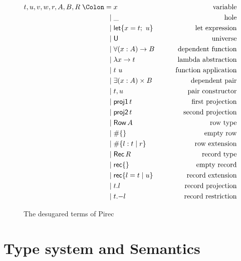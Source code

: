\begin{figure}
  \begin{alignat*}{2}
    t, u, v, w, r, A, B, R \Coleqq{}
     & x
     & \qquad\text{variable}
    \\
    \mid{}
     & \_
     & \qquad\text{hole}
    \\
    \mid{}
     & {\Let \{ x = t;\ u \}}
     & \qquad\text{let expression}
    \\
    \mid{}
     & {\Univ}
     & \qquad\text{universe}
    \\
    \mid{}
     & \forall (x : A) \to B
     & \qquad\text{dependent function}
    \\
    \mid{}
     & \lambda x \to t
     & \qquad\text{lambda abstraction}
    \\
    \mid{}
     & t\ u
     & \qquad\text{function application}
    \\
    \mid{}
     & \exists (x : A) \times B
     & \qquad\text{dependent pair}
    \\
    \mid{}
     & t, u
     & \qquad\text{pair constructor}
    \\
    \mid{}
     & {\ProjOne t}
     & \qquad\text{first projection}
    \\
    \mid{}
     & {\ProjTwo t}
     & \qquad\text{second projection}
    \\
    \mid{}
     & {\RowType A}
     & \qquad\text{row type}
    \\
    \mid{}
     & \# \{ \}
     & \qquad\text{empty row}
    \\
    \mid{}
     & \# \{ l : t \mid r \}
     & \qquad\text{row extension}
    \\
    \mid{}
     & {\RecordType R}
     & \qquad\text{record type}
    \\
    \mid{}
     & {\RecordLit \{ \}}
     & \qquad\text{empty record}
    \\
    \mid{}
     & {\RecordLit \{ l = t \mid u \}}
     & \qquad\text{record extension}
    \\
    \mid{}
     & t.l
     & \qquad\text{record projection}
    \\
    \mid{}
     & t \RecordRestr l
     & \qquad\text{record restriction}
  \end{alignat*}
  \caption{The desugared terms of Pirec}\label{fig:term}
\end{figure}

\section{Type system and Semantics}\label{sec:typesem}

